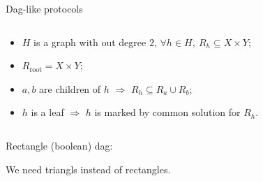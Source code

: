 \begin{frame}{Dag-like protocols}
    \vspace{-0.8cm}
    \begin{columns}[t]
        \begin{column}{0.58\textwidth}
            \begin{itemize}
                \item $H$ is a graph with out degree $2$, $\forall h \in H, ~ R_h \subseteq X \times Y$;
                \item $R_{\mathrm{root}} = X \times Y$;
                \item $a, b$ are children of $h$ $\Rightarrow$ $R_{h} \subseteq R_{a} \cup R_{b}$;
                \item $h$ is a leaf $\Rightarrow$ $h$ is marked by common solution for $R_h$.
            \end{itemize}
        \end{column}

		\begin{column}{0.38\textwidth}
            \begin{center}
                
            \end{center}
		\end{column}
	\end{columns}

    \pause
    \begin{center}
        Rectangle (boolean) dag:
        
        \vspace{0.2cm}
        
    \end{center}

    We need \alert{triangls} instead of rectangles.

\end{frame}

